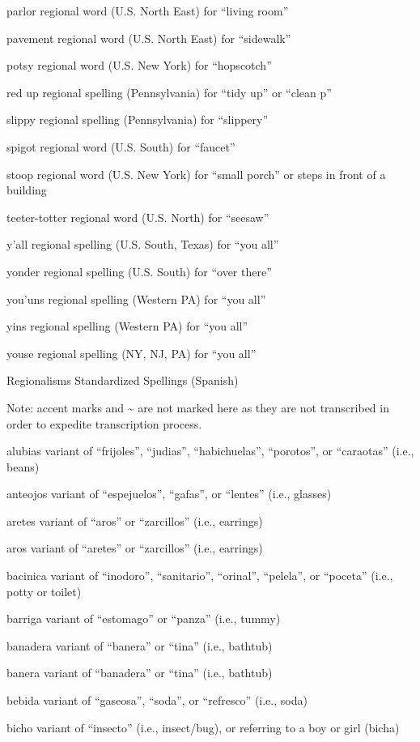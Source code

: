 \documentclass[
]{book}
\begin{document}
parlor
regional word (U.S. North East) for ``living room''

pavement
regional word (U.S. North East) for ``sidewalk''

potsy
regional word (U.S. New York) for ``hopscotch''

red up
regional spelling (Pennsylvania) for ``tidy up'' or ``clean p''

slippy
regional spelling (Pennsylvania) for ``slippery''

spigot
regional word (U.S. South) for ``faucet''

stoop
regional word (U.S. New York) for ``small porch'' or steps in front of a building

teeter-totter
regional word (U.S. North) for ``seesaw''

y'all
regional spelling (U.S. South, Texas) for ``you all''

yonder
regional spelling (U.S. South) for ``over there''

you'uns
regional spelling (Western PA) for ``you all''

yins
regional spelling (Western PA) for ``you all''

youse
regional spelling (NY, NJ, PA) for ``you all''

Regionalisms Standardized Spellings (Spanish)

Note: accent marks and \textasciitilde{} are not marked here as they are not transcribed in order to expedite transcription process.

alubias
variant of ``frijoles'', ``judias'', ``habichuelas'', ``porotos'', or ``caraotas'' (i.e., beans)

anteojos
variant of ``espejuelos'', ``gafas'', or ``lentes'' (i.e., glasses)

aretes
variant of ``aros'' or ``zarcillos'' (i.e., earrings)

aros
variant of ``aretes'' or ``zarcillos'' (i.e., earrings)

bacinica
variant of ``inodoro'', ``sanitario'', ``orinal'', ``pelela'', or ``poceta'' (i.e., potty or toilet)

barriga
variant of ``estomago'' or ``panza'' (i.e., tummy)

banadera
variant of ``banera'' or ``tina'' (i.e., bathtub)

banera
variant of ``banadera'' or ``tina'' (i.e., bathtub)

bebida
variant of ``gaseosa'', ``soda'', or ``refresco'' (i.e., soda)

bicho
variant of ``insecto'' (i.e., insect/bug), or referring to a boy or girl (bicha)
\end{document}
